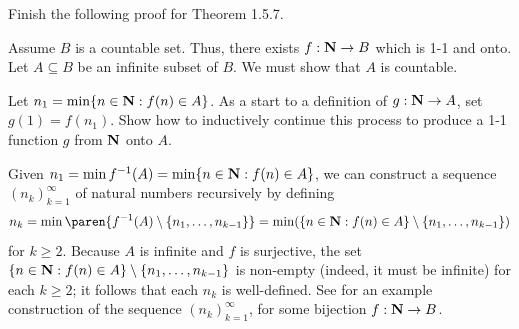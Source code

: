 \documentclass{lew98_solutions}
\begin{document}
\begin{exercise}
\label{ex:1.5.1}
    Finish the following proof for Theorem 1.5.7.

    Assume \( B \) is a countable set. Thus, there exists \( f : \mathbf{N} \to B \) which is 1-1 and onto. Let \( A \subseteq B \) be an infinite subset of \( B \). We must show that \( A \) is countable.

    Let \( n_1 = \min \{ n \in \mathbf{N} : f(n) \in A \} \). As a start to a definition of \( g : \mathbf{N} \to A \), set \( g(1) = f(n_1) \). Show how to inductively continue this process to produce a 1-1 function \( g \) from \( \mathbf{N} \) onto \( A \).
\end{exercise}

\begin{solution}
    Given \( n_1 = \min f^{-1}(A) = \min \{ n \in \mathbf{N} : f(n) \in A \} \), we can construct a sequence \( (n_k)_{k=1}^{\infty} \) of natural numbers recursively by defining
    \[
        n_k = \min \paren{ f^{-1}(A) \setminus \{ n_1, \ldots, n_{k-1} \} } = \min (\{ n \in \N : f(n) \in A \} \setminus \{ n_1, \ldots, n_{k-1} \})
    \]
    for \( k \geq 2 \). Because \( A \) is infinite and \( f \) is surjective, the set \( \{ n \in \mathbf{N} : f(n) \in A \} \setminus \{ n_1, \ldots, n_{k-1} \} \) is non-empty (indeed, it must be infinite) for each \( k \geq 2 \); it follows that each \( n_k \) is well-defined. See  for an example construction of the sequence \( (n_k)_{k=1}^{\infty} \), for some bijection \( f : \mathbf{N} \to B \).

    \begin{figure}[h]
        \centering
\end{figure}
\end{solution}
\end{document}
